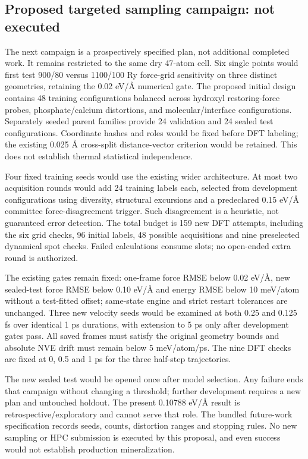 \subsection{Proposed targeted sampling campaign: not executed}
The next campaign is a prospectively specified plan, not additional completed work.
It remains restricted to the same dry 47-atom cell. Six single points would first test
900/80 versus 1100/100 Ry force-grid sensitivity on three distinct geometries, retaining
the 0.02 eV/\AA{} numerical gate. The proposed initial design contains 48 training
configurations balanced across hydroxyl restoring-force probes, phosphate/calcium
distortions, and molecular/interface configurations. Separately seeded parent families
provide 24 validation and 24 sealed test configurations. Coordinate hashes and roles
would be fixed before DFT labeling; the existing 0.025 \AA{} cross-split distance-vector
criterion would be retained. This does not establish thermal statistical independence.

Four fixed training seeds would use the existing wider architecture. At most two
acquisition rounds would add 24 training labels each, selected from development
configurations using diversity, structural excursions and a predeclared 0.15 eV/\AA{}
committee force-disagreement trigger. Such disagreement is a heuristic, not guaranteed
error detection. The total budget is 159 new DFT attempts, including the six grid
checks, 96 initial labels, 48 possible acquisitions and nine preselected dynamical
spot checks. Failed calculations consume slots; no open-ended extra round is authorized.

The existing gates remain fixed: one-frame force RMSE below 0.02 eV/\AA, new sealed-test
force RMSE below 0.10 eV/\AA{} and energy RMSE below 10 meV/atom without a test-fitted
offset; same-state engine and strict restart tolerances are unchanged. Three new
velocity seeds would be examined at both 0.25 and 0.125 fs over identical 1 ps durations,
with extension to 5 ps only after development gates pass. All saved frames must satisfy
the original geometry bounds and absolute NVE drift must remain below 5 meV/atom/ps.
The nine DFT checks are fixed at 0, 0.5 and 1 ps for the three half-step trajectories.

The new sealed test would be opened once after model selection. Any failure ends that
campaign without changing a threshold; further development requires a new plan and
untouched holdout. The present 0.10788 eV/\AA{} result is retrospective/exploratory and
cannot serve that role. The bundled future-work specification records seeds, counts,
distortion ranges and stopping rules. No new sampling or HPC submission is executed
by this proposal, and even success would not establish production mineralization.
